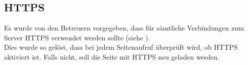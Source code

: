 \subsection{HTTPS}
\label{sec:content_solutions_https}
Es wurde von den Betreuern vorgegeben, dass für sämtliche Verbindungen zum Server HTTPS verwendet werden sollte (siehe ).\\
Dies wurde so gelöst, dass bei jedem Seitenaufruf überprüft wird, ob HTTPS aktiviert ist. Falls nicht, soll die Seite mit HTTPS neu geladen werden.